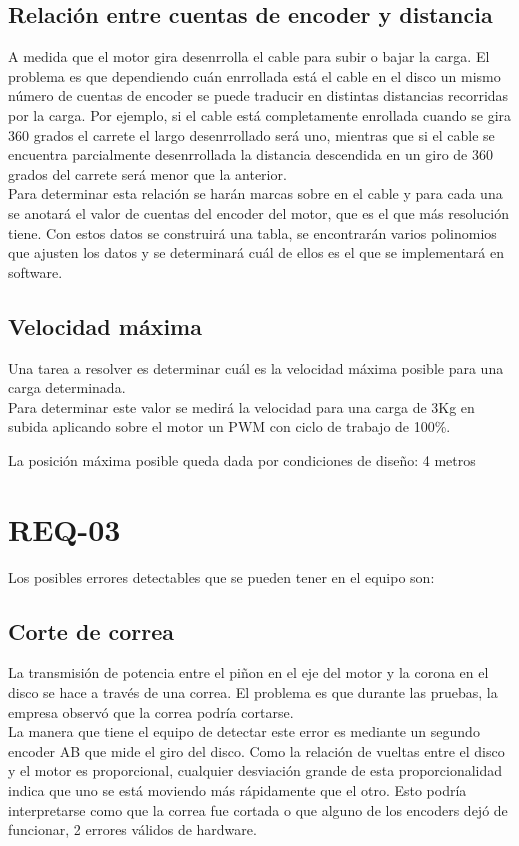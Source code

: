 \subsection{Relación entre cuentas de encoder y distancia}
A medida que el motor gira desenrrolla el cable para subir o bajar la carga. El problema es que dependiendo cuán enrrollada está el cable en el disco un mismo número de cuentas de encoder se puede traducir en distintas distancias recorridas por la carga. Por ejemplo, si el cable está completamente enrollada cuando se gira 360 grados el carrete el largo desenrrollado será uno, mientras que si el cable se encuentra parcialmente desenrrollada la distancia descendida en un giro de 360 grados del carrete será menor que la anterior.\\
Para determinar esta relación se harán marcas sobre en el cable y para cada una se anotará el valor de cuentas del encoder del motor, que es el que más resolución tiene. Con estos datos se construirá una tabla, se encontrarán varios polinomios que ajusten los datos y se determinará cuál de ellos es el que se implementará en software.

\subsection{Velocidad máxima}
Una tarea a resolver es determinar cuál es la velocidad máxima posible para una carga determinada.\\

Para determinar este valor se medirá la velocidad para una carga de 3Kg en subida aplicando sobre el motor un PWM con ciclo de trabajo de 100\%.

La posición máxima posible queda dada por condiciones de diseño: 4 metros

\section{REQ-03} \label{sec:\thesection}
Los posibles errores detectables que se pueden tener en el equipo son:

\subsection{Corte de correa}
La transmisión de potencia entre el piñon en el eje del motor y la corona en el disco se hace a través de una correa. El problema es que durante las pruebas, la empresa observó que la correa podría cortarse. \\
La manera que tiene el equipo de detectar este error es mediante un segundo encoder AB que mide el giro del disco. Como la relación de vueltas entre el disco y el motor es proporcional, cualquier desviación grande de esta proporcionalidad indica que uno se está moviendo más rápidamente que el otro. Esto podría interpretarse como que la correa fue cortada o que alguno de los encoders dejó de funcionar, 2 errores válidos de hardware.

